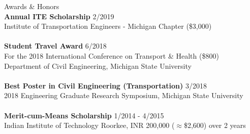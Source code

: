 \documentclass{CV} %
\begin{document}
\begin{rSection}{Awards \& Honors}
    \\ \textbf{Annual ITE Scholarship} \hfill {2/2019}
    \\ Institute of Transportation Engineers - Michigan Chapter (\$3,000) \\
    \\ \textbf{Student Travel Award} \hfill {6/2018}
    \\ For the 2018 International Conference on Transport \& Health (\$800)
    \\ Department of Civil Engineering, Michigan State University \\
    \\ \textbf{Best Poster in Civil Engineering (Transportation)} \hfill{3/2018}
    \\ 2018 Engineering Graduate Research Symposium, Michigan State University \\
    \\ \textbf{Merit-cum-Means Scholarship} \hfill{1/2014 - 4/2015}
    \\ Indian Institute of Technology Roorkee, INR 200,000 ($\approx$\$2,600) over 2 years
\end{rSection}
\end{document}
